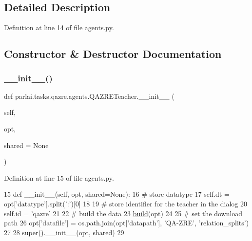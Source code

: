 \subsection{Detailed Description}


Definition at line 14 of file agents.\+py.



\subsection{Constructor \& Destructor Documentation}
\mbox{\label{classparlai_1_1tasks_1_1qazre_1_1agents_1_1QAZRETeacher_aca6be88f2ece62ebd551337e277a8ca3}} 
\subsubsection{\texorpdfstring{\+\_\+\+\_\+init\+\_\+\+\_\+()}{\_\_init\_\_()}}
{\footnotesize\ttfamily def parlai.\+tasks.\+qazre.\+agents.\+Q\+A\+Z\+R\+E\+Teacher.\+\_\+\+\_\+init\+\_\+\+\_\+ (\begin{DoxyParamCaption}\item[{}]{self,  }\item[{}]{opt,  }\item[{}]{shared = {\ttfamily None} }\end{DoxyParamCaption})}



Definition at line 15 of file agents.\+py.


\begin{DoxyCode}
15     \textcolor{keyword}{def }\_\_init\_\_(self, opt, shared=None):
16         \textcolor{comment}{# store datatype}
17         self.dt = opt[\textcolor{stringliteral}{'datatype'}].split(\textcolor{stringliteral}{':'})[0]
18 
19         \textcolor{comment}{# store identifier for the teacher in the dialog}
20         self.id = \textcolor{stringliteral}{'qazre'}
21 
22         \textcolor{comment}{# build the data}
23         \hyperlink{namespaceparlai_1_1mturk_1_1tasks_1_1talkthewalk_1_1download_a8c0fbb9b6dfe127cb8c1bd6e7c4e33fd}{build}(opt)
24 
25         \textcolor{comment}{# set the download path}
26         opt[\textcolor{stringliteral}{'datafile'}] = os.path.join(opt[\textcolor{stringliteral}{'datapath'}], \textcolor{stringliteral}{'QA-ZRE'}, \textcolor{stringliteral}{'relation\_splits'})
27 
28         super().\_\_init\_\_(opt, shared)
29 
\end{DoxyCode}


